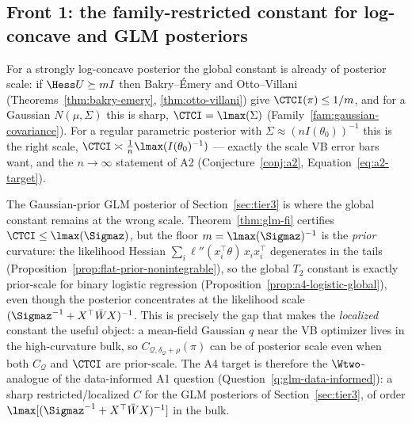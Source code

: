 \documentclass[../../main.tex]{subfiles}
\begin{document}
\subsection{Front 1: the family-restricted constant for log-concave and GLM posteriors}
\label{subsec:a4-restricted}

For a strongly log-concave posterior the global constant is already of posterior scale: if
$\Hess U\succeq mI$ then Bakry--\'Emery and Otto--Villani
(Theorems~\ref{thm:bakry-emery}, \ref{thm:otto-villani}) give $\CTCI(\pi)\le1/m$, and for a
Gaussian $N(\mu,\Sigma)$ this is sharp, $\CTCI=\lmax(\Sigma)$
(Family~\ref{fam:gaussian-covariance}). For a regular parametric posterior with
$\Sigma\approx(nI(\theta_0))^{-1}$ this is the right scale,
$\CTCI\asymp\tfrac1n\lmax(I(\theta_0)^{-1})$ --- exactly the scale VB error bars want, and the
$n\to\infty$ statement of A2 (Conjecture~\ref{conj:a2}, Equation~\eqref{eq:a2-target}).

The Gaussian-prior GLM posterior of Section~\ref{sec:tier3} is where the global constant remains
at the wrong scale. Theorem~\ref{thm:glm-fi} certifies $\CTCI\le\lmax(\Sigmaz)$, but the floor
$m=\lmax(\Sigmaz)^{-1}$ is the \emph{prior} curvature: the likelihood Hessian
$\sum_i\ell''(x_i^\top\theta)\,x_ix_i^\top$ degenerates in the tails
(Proposition~\ref{prop:flat-prior-nonintegrable}), so the global $T_2$ constant is exactly
prior-scale for binary logistic regression (Proposition~\ref{prop:a4-logistic-global}), even
though the posterior concentrates at the likelihood scale
$(\Sigmaz^{-1}+X^\top\bar W X)^{-1}$. This is precisely the gap that makes the \emph{localized}
constant the useful object: a mean-field Gaussian $q$ near the VB optimizer lives in the
high-curvature bulk, so $C_{\mathcal Q,\delta_{\mathcal Q}+\rho}(\pi)$ can be of posterior scale
even when both $C_{\mathcal Q}$ and $\CTCI$ are prior-scale. The A4 target is therefore the $\Wtwo$-analogue of the data-informed
A1 question (Question~\ref{q:glm-data-informed}): a sharp restricted/localized $C$ for the GLM
posteriors of Section~\ref{sec:tier3}, of order
$\lmax[(\Sigmaz^{-1}+X^\top\bar W X)^{-1}]$ in the bulk.
\end{document}
